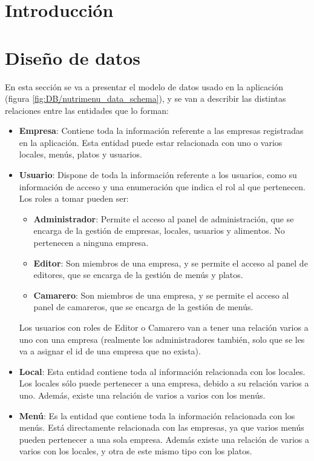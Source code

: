 
\section{Introducción}

\section{Diseño de datos}

En esta sección se va a presentar el modelo de datos usado en la aplicación (figura \ref{fig:DB/nutrimenu_data_schema}), y se van a describir las distintas relaciones entre las entidades que lo forman:

\begin{itemize}
	\item \textbf{Empresa}: Contiene toda la información referente a las empresas registradas en la aplicación. Esta entidad puede estar relacionada con uno o varios locales, menús, platos y usuarios.
	\item \textbf{Usuario}: Dispone de toda la información referente a los usuarios, como su información de acceso y una enumeración que indica el rol al que pertenecen. Los roles a tomar pueden ser:
	\begin{itemize}
		\item \textbf{Administrador}: Permite el acceso al panel de administración, que se encarga de la gestión de empresas, locales, usuarios y alimentos. No pertenecen a ninguna empresa.
		\item \textbf{Editor}: Son miembros de una empresa, y se permite el acceso al panel de editores, que se encarga de la gestión de menús y platos.
		\item \textbf{Camarero}: Son miembros de una empresa, y se permite el acceso al panel de camareros, que se encarga de la gestión de menús.
	\end{itemize}
	Los usuarios con roles de Editor o Camarero van a tener una relación varios a uno con una empresa (realmente los administradores también, solo que se les va a asignar el id de una empresa que no exista).
	\item \textbf{Local}: Esta entidad contiene toda al información relacionada con los locales. Los locales sólo puede pertenecer a una empresa, debido a su relación varios a uno. Además, existe una relación de varios a varios con los menús.
	\item \textbf{Menú}: Es la entidad que contiene toda la información relacionada con los menús. Está directamente relacionada con las empresas, ya que varios menús pueden pertenecer a una sola empresa. Además existe una relación de varios a varios con los locales, y otra de este mismo tipo con los platos.

\end{itemize}
